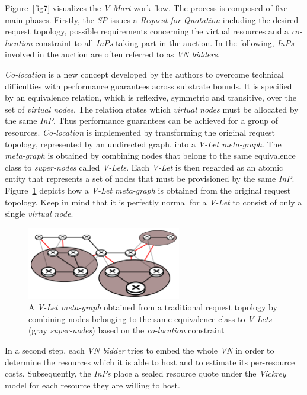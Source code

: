 \documentclass[prodmode,acmtomccap]{acmlarge}
\begin{document}
Figure~\ref{fig7} visualizes the \emph{V-Mart} work-flow. The process is composed of five main phases. 
Firstly, the \emph{SP} issues a \emph{Request for Quotation} including the desired request
topology, possible requirements concerning the virtual resources and a \emph{co-location} constraint to all \emph{InPs} taking part in the auction. In the following, \emph{InPs} involved in the auction
are often referred to as \emph{VN bidders}.

\emph{Co-location} is a new concept developed by the authors to overcome technical difficulties with
performance guarantees across substrate bounds. It is specified by an equivalence relation, which is reflexive, symmetric and transitive, over the set of \emph{virtual nodes}. The relation
states which \emph{virtual nodes} must be allocated by the same \emph{InP}. Thus  performance guarantees can be achieved for a group of resources. 
\emph{Co-location} is implemented by transforming the original request topology, represented by an undirected graph, into a \emph{V-Let meta-graph}. The \emph{meta-graph} is obtained
by combining nodes that belong to the same equivalence class to \emph{super-nodes} called \emph{V-Lets}. Each \emph{V-Let} is then regarded as an atomic entity that represents a set of nodes that must
be provisioned by the same \emph{InP}. Figure~\ref{fig8} depicts how a \emph{V-Let meta-graph} is obtained from the original request topology. Keep in mind that it is perfectly normal for a \emph{V-Let}
to consist of only a single \emph{virtual node}.

\begin{figure}[htb]
	\centering
	\includegraphics[width=0.6\textwidth]{colocation}
	\caption{A \emph{V-Let meta-graph} obtained from a traditional request topology by combining nodes belonging to the same equivalence class to \emph{V-Lets} (gray \emph{super-nodes}) based on the
		\emph{co-location} constraint}
	\label{fig8}
\end{figure}

In a second step, each \emph{VN bidder} tries to embed the whole \emph{VN} in order to determine the resources which it is able to host and to estimate its per-resource costs. Subsequently, 
the \emph{InPs} place a sealed resource quote under the \emph{Vickrey} model for each resource they are willing to host.
\end{document}
